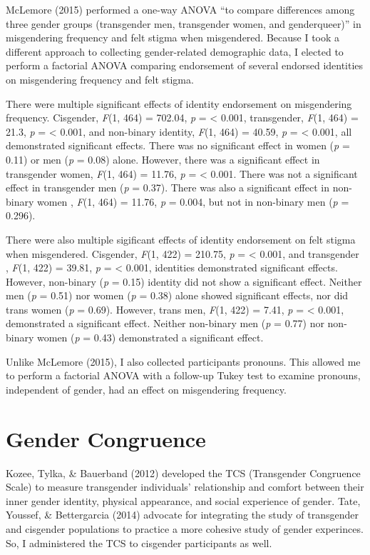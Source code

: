 \documentclass[12pt,twoside]{reedthesis}
\begin{document}
McLemore (2015) performed a one-way ANOVA ``to compare differences among
three gender groups (transgender men, transgender women, and
genderqueer)'' in misgendering frequency and felt stigma when
misgendered. Because I took a different approach to collecting
gender-related demographic data, I elected to perform a factorial ANOVA
comparing endorsement of several endorsed identities on misgendering
frequency and felt stigma.

There were multiple significant effects of identity endorsement on
misgendering frequency. Cisgender, \emph{F}(1, 464) = 702.04, \emph{p} =
\textless{} 0.001, transgender, \emph{F}(1, 464) = 21.3, \emph{p} =
\textless{} 0.001, and non-binary identity, \emph{F}(1, 464) = 40.59,
\emph{p} = \textless{} 0.001, all demonstrated significant effects.
There was no significant effect in women (\emph{p} = 0.11) or men
(\emph{p} = 0.08) alone. However, there was a significant effect in
transgender women, \emph{F}(1, 464) = 11.76, \emph{p} = \textless{}
0.001. There was not a significant effect in transgender men (\emph{p} =
0.37). There was also a significant effect in non-binary women ,
\emph{F}(1, 464) = 11.76, \emph{p} = 0.004, but not in non-binary men
(\emph{p} = 0.296).

There were also multiple sigificant effects of identity endorsement on
felt stigma when misgendered. Cisgender, \emph{F}(1, 422) = 210.75,
\emph{p} = \textless{} 0.001, and transgender , \emph{F}(1, 422) =
39.81, \emph{p} = \textless{} 0.001, identities demonstrated significant
effects. However, non-binary (\emph{p} = 0.15) identity did not show a
significant effect. Neither men (\emph{p} = 0.51) nor women (\emph{p} =
0.38) alone showed significant effects, nor did trans women (\emph{p} =
0.69). However, trans men, \emph{F}(1, 422) = 7.41, \emph{p} =
\textless{} 0.001, demonstrated a significant effect. Neither non-binary
men (\emph{p} = 0.77) nor non-binary women (\emph{p} = 0.43)
demonstrated a significant effect.

Unlike McLemore (2015), I also collected participants pronouns. This
allowed me to perform a factorial ANOVA with a follow-up Tukey test to
examine pronouns, independent of gender, had an effect on misgendering
frequency.

\section{Gender Congruence}\label{gender-congruence}

Kozee, Tylka, \& Bauerband (2012) developed the TCS (Transgender
Congruence Scale) to measure transgender individuals' relationship and
comfort between their inner gender identity, physical appearance, and
social experience of gender. Tate, Youssef, \& Bettergarcia (2014)
advocate for integrating the study of transgender and cisgender
populations to practice a more cohesive study of gender experinces. So,
I administered the TCS to cisgender participants as well.
\end{document}
